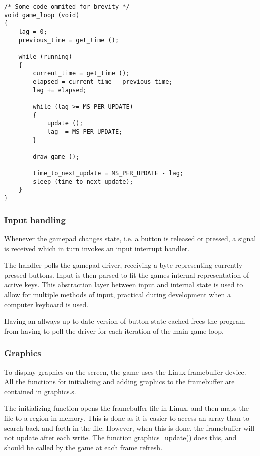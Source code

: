 \begin{lstlisting}[caption={Main game loop}, label={lst:main-game-loop}]
/* Some code ommited for brevity */
void game_loop (void)
{
    lag = 0;
    previous_time = get_time ();

    while (running)
    {
        current_time = get_time ();
        elapsed = current_time - previous_time;
        lag += elapsed;

        while (lag >= MS_PER_UPDATE)
        {
            update ();
            lag -= MS_PER_UPDATE;
        }

        draw_game ();

        time_to_next_update = MS_PER_UPDATE - lag;
        sleep (time_to_next_update);
    }
}
\end{lstlisting}


\subsubsection{Input handling}
Whenever the gamepad changes state, i.e. a button is released or pressed,
a signal is received which in turn invokes an input interrupt handler.

The handler polls the gamepad driver, receiving a byte representing currently
pressed buttons. Input is then parsed to fit the games internal representation
of active keys. This abstraction layer between input and internal state is used
to allow for multiple methods of input, practical during development when a
computer keyboard is used.

Having an allways up to date version of button state cached frees the program
from having to poll the driver for each iteration of the main game loop.

\subsubsection{Graphics}
To display graphics on the screen, the game uses the Linux framebuffer device.
All the functions for initialising and adding graphics to the framebuffer are
contained in graphics.s.

The initializing function opens the framebuffer file in Linux, and then maps
the file to a region in memory.  This is done as it is easier to access an
array than to search back and forth in the file.  However, when this is done,
the framebuffer will not update after each write.  The function
graphics\_update() does this, and should be called by the game at each frame
refresh.

